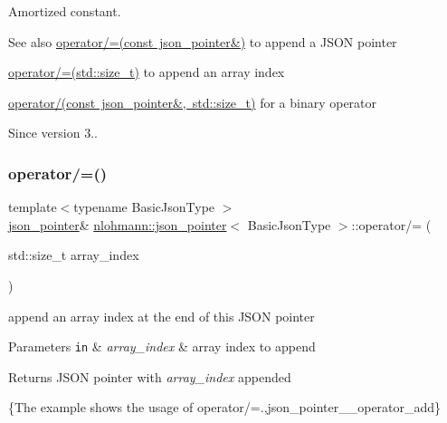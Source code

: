 Amortized constant.

\begin{DoxySeeAlso}{See also}
\mbox{\hyperlink{classnlohmann_1_1json__pointer_a7395bd0af29ac23fd3f21543c935cdfa}{operator/=(const json\+\_\+pointer\&)}} to append a J\+S\+ON pointer 

\mbox{\hyperlink{classnlohmann_1_1json__pointer_a64c8401529131bad1e486d91d703795f}{operator/=(std\+::size\+\_\+t)}} to append an array index 

\mbox{\hyperlink{classnlohmann_1_1json__pointer_a9f6bc6f4d4668b4e9a19d8b8ac29da4f}{operator/(const json\+\_\+pointer\&, std\+::size\+\_\+t)}} for a binary operator
\end{DoxySeeAlso}
\begin{DoxySince}{Since}
version 3.. 
\end{DoxySince}
\mbox{\label{classnlohmann_1_1json__pointer_a64c8401529131bad1e486d91d703795f}} 
\subsubsection{\texorpdfstring{operator/=()}{operator/=()}\hspace{0.1cm}{\footnotesize\ttfamily [3/3]}}
{\footnotesize\ttfamily template$<$typename Basic\+Json\+Type $>$ \\
\mbox{\hyperlink{classnlohmann_1_1json__pointer}{json\+\_\+pointer}}\& \mbox{\hyperlink{classnlohmann_1_1json__pointer}{nlohmann\+::json\+\_\+pointer}}$<$ Basic\+Json\+Type $>$\+::operator/= (\begin{DoxyParamCaption}\item[{std\+::size\+\_\+t}]{array\+\_\+index }\end{DoxyParamCaption})\hspace{0.3cm}{\ttfamily [inline]}}



append an array index at the end of this J\+S\+ON pointer 


\begin{DoxyParams}[1]{Parameters}
\mbox{\tt in}  & {\em array\+\_\+index} & array index to append \\
\hline
\end{DoxyParams}
\begin{DoxyReturn}{Returns}
J\+S\+ON pointer with {\itshape array\+\_\+index} appended
\end{DoxyReturn}
\{The example shows the usage of {\ttfamily operator/=}.,json\+\_\+pointer\+\_\+\+\_\+operator\+\_\+add\}

